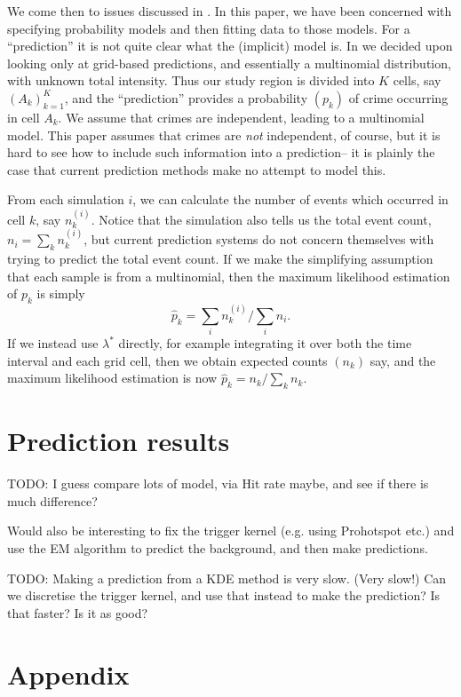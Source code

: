 \documentclass[twoside,a4paper]{article}
\theoremstyle{plain}
\theoremstyle{definition}
\begin{document}
We come then to issues discussed in \cite{daws2}.  In this paper, we have been concerned
with specifying probability models and then fitting data to those models.  For a ``prediction''
it is not quite clear what the (implicit) model is.  In \cite{daws2} we decided upon
looking only at grid-based predictions, and essentially a multinomial distribution, with
unknown total intensity.  Thus our study region is divided into $K$ cells, say $(A_k)_{k=1}^K$,
and the ``prediction'' provides a probability $(p_k)$ of crime occurring in cell $A_k$.
We assume that crimes are independent, leading to a multinomial model.  This paper assumes that
crimes are \emph{not} independent, of course, but it is hard to see how to include such
information into a prediction-- it is plainly the case that current prediction methods make
no attempt to model this.

From each simulation $i$, we can calculate the number of events which occurred in cell $k$, say
$n_k^{(i)}$.  Notice that the simulation also tells us the total event count, $n_i=\sum_k n^{(i)}_k$,
but current prediction systems do not concern themselves with trying to predict the total
event count.  If we make the simplifying assumption that each sample is from a multinomial, then the
maximum likelihood estimation of $p_k$ is simply
\[ \hat p_k = \sum_i n_k^{(i)} / \sum_i n_i. \]
If we instead use $\lambda^*$ directly, for example integrating it over both the time interval and
each grid cell, then we obtain expected counts $(n_k)$ say, and the maximum likelihood estimation
is now $\hat p_k = n_k / \sum_k n_k$.

\section{Prediction results}

TODO: I guess compare lots of model, via Hit rate maybe, and see if there is much difference?

Would also be interesting to fix the trigger kernel (e.g. using Prohotspot etc.) and use
the EM algorithm to predict the background, and then make predictions.

TODO: Making a prediction from a KDE method is very slow. (Very slow!)  Can we discretise the trigger kernel, and use that instead to make the prediction?  Is that faster?  Is it as good?



\appendix
\section{Appendix}
\end{document}
